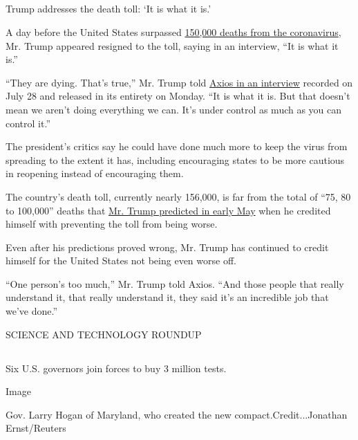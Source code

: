 \hypertarget{-8}{%
\subsection{}\label{-8}}

Trump addresses the death toll: `It is what it is.'

A day before the United States surpassed
\href{https://www.nytimes3xbfgragh.onion/2020/07/29/us/coronavirus-deaths-150000.html}{150,000
deaths from the coronavirus}, Mr. Trump appeared resigned to the toll,
saying in an interview, ``It is what it is.''

``They are dying. That's true,'' Mr. Trump told
\href{https://www.axios.com/full-axios-hbo-interview-donald-trump-cd5a67e1-6ba1-46c8-bb3d-8717ab9f3cc5.html}{Axios
in an interview} recorded on July 28 and released in its entirety on
Monday. ``It is what it is. But that doesn't mean we aren't doing
everything we can. It's under control as much as you can control it.''

The president's critics say he could have done much more to keep the
virus from spreading to the extent it has, including encouraging states
to be more cautious in reopening instead of encouraging them.

The country's death toll, currently nearly 156,000, is far from the
total of ``75, 80 to 100,000'' deaths that
\href{https://www.nytimes3xbfgragh.onion/2020/05/03/us/politics/trump-coronavirus.html}{Mr.
Trump predicted in early May} when he credited himself with preventing
the toll from being worse.

Even after his predictions proved wrong, Mr. Trump has continued to
credit himself for the United States not being even worse off.

``One person's too much,'' Mr. Trump told Axios. ``And those people that
really understand it, that really understand it, they said it's an
incredible job that we've done.''

SCIENCE AND TECHNOLOGY ROUNDUP

\hypertarget{-9}{%
\subsection{}\label{-9}}

Six U.S. governors join forces to buy 3 million tests.

Image

Gov. Larry Hogan of Maryland, who created the new
compact.Credit...Jonathan Ernst/Reuters

